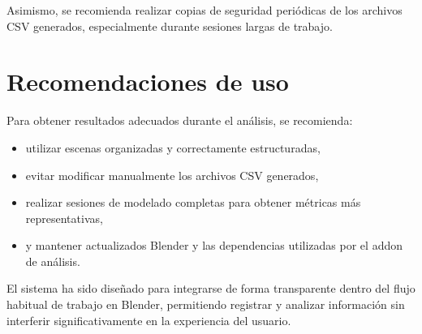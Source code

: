 Asimismo, se recomienda realizar copias de seguridad periódicas de los archivos CSV generados, especialmente durante sesiones largas de trabajo.

\section{Recomendaciones de uso}

Para obtener resultados adecuados durante el análisis, se recomienda:

\begin{itemize}
    \item utilizar escenas organizadas y correctamente estructuradas,
    \item evitar modificar manualmente los archivos CSV generados,
    \item realizar sesiones de modelado completas para obtener métricas más representativas,
    \item y mantener actualizados Blender y las dependencias utilizadas por el addon de análisis.
\end{itemize}

El sistema ha sido diseñado para integrarse de forma transparente dentro del flujo habitual de trabajo en Blender, permitiendo registrar y analizar información sin interferir significativamente en la experiencia del usuario.